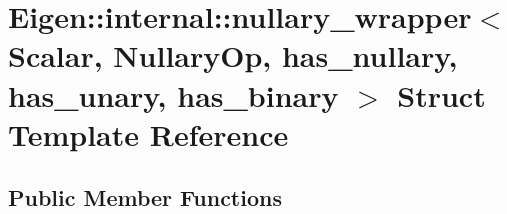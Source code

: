 \hypertarget{struct_eigen_1_1internal_1_1nullary__wrapper}{}\section{Eigen\+:\+:internal\+:\+:nullary\+\_\+wrapper$<$ Scalar, Nullary\+Op, has\+\_\+nullary, has\+\_\+unary, has\+\_\+binary $>$ Struct Template Reference}
\label{struct_eigen_1_1internal_1_1nullary__wrapper}
\subsection*{Public Member Functions}
